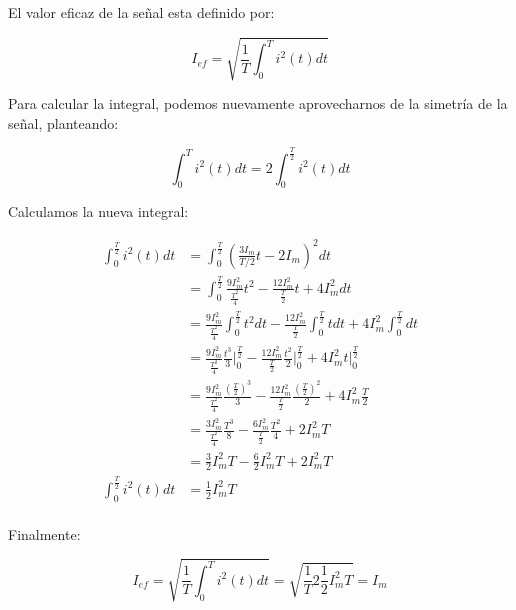 El valor eficaz de la señal esta definido por:

\begin{equation}
  I_{ef}= \sqrt{ \frac{1}{T} \int_0^T i^2(t) dt }
\end{equation}

Para calcular la integral, podemos nuevamente aprovecharnos de la simetría de la señal, planteando:

\begin{equation}
  \int_0^T i^2(t) dt = 2 \int_0^{\frac{T}{2}} i^2(t) dt
\end{equation}

Calculamos la nueva integral:

\begin{align*}
  \int_0^{\frac{T}{2}} i^2(t) dt &= \int_0^{\frac{T}{2}} \left(\frac{3I_m}{T/2} t - 2I_m\right)^2 dt\\
  &= \int_0^{\frac{T}{2}} \frac{9I_m^2}{\frac{T^2}{4}} t^2 - \frac{12 I_m^2}{\frac{T}{2}} t + 4I_m^2 dt\\
  &= \frac{9I_m^2}{\frac{T^2}{4}} \int_0^{\frac{T}{2}} t^2 dt - \frac{12 I_m^2}{\frac{T}{2}} \int_0^{\frac{T}{2}} t dt + 4I_m^2 \int_0^{\frac{T}{2}} dt\\
  &= \frac{9I_m^2}{\frac{T^2}{4}} \frac{t^3}{3} \bigg|_0^{\frac{T}{2}} - \frac{12 I_m^2}{\frac{T}{2}} \frac{t^2}{2} \bigg|_0^{\frac{T}{2}} + 4I_m^2 t \Big|_0^{\frac{T}{2}} \\
  &= \frac{9I_m^2}{\frac{T^2}{4}} \frac{\left(\frac{T}{2}\right)^3}{3} - \frac{12 I_m^2}{\frac{T}{2}} \frac{\left(\frac{T}{2}\right)^2}{2} + 4I_m^2 \frac{T}{2} \\
  &= \frac{3I_m^2}{\frac{T^2}{4}} \frac{T^3}{8} - \frac{6 I_m^2}{\frac{T}{2}} \frac{T^2}{4} + 2I_m^2 T \\
  &= \frac{3}{2} I_m^2T - \frac{6}{2} I_m^2 T + 2I_m^2 T \\
  \int_0^{\frac{T}{2}} i^2(t) dt &= \frac{1}{2} I_m^2 T\\
\end{align*}

Finalmente:

\begin{equation}
  I_{ef}= \sqrt{ \frac{1}{T} \int_0^T i^2(t) dt } = \sqrt{ \frac{1}{T} 2 \frac{1}{2} I_m^2 T} = I_m
\end{equation}

